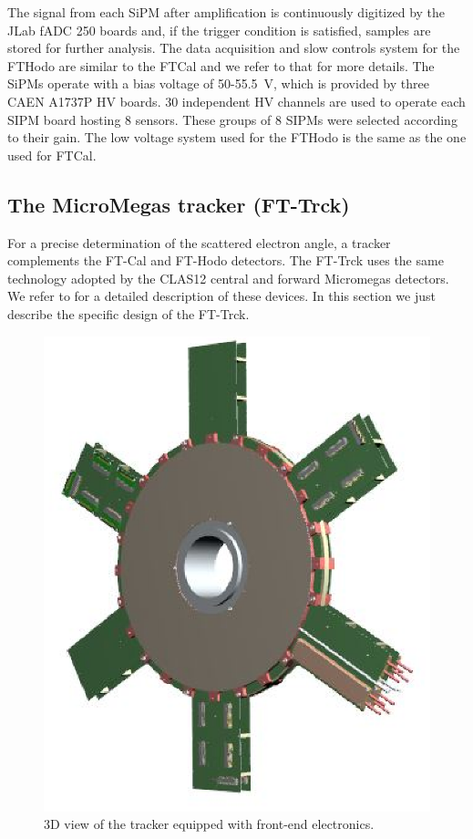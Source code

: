 The signal from each SiPM after amplification is continuously digitized by the JLab fADC 250 boards and, if the trigger condition is satisfied, samples are stored for further analysis. The data acquisition and slow controls system for the FTHodo are similar to the FTCal and we refer to that for more details. The SiPMs operate with a bias voltage of 50-55.5~V, which is provided by three CAEN A1737P HV boards. 30 independent HV channels are used to operate each SIPM board hosting 8 sensors. These groups of 8 SIPMs were selected according to their gain. The low voltage system used for the FTHodo is the same as the one used for FTCal.


\subsection{The MicroMegas tracker (FT-Trck)}
For a precise determination of the scattered electron angle, a tracker complements the FT-Cal and FT-Hodo detectors. The FT-Trck uses the same technology adopted by the CLAS12 central and forward Micromegas detectors. We refer to \cite{mm} for a detailed description of  these devices. In this section we just describe the specific design of the FT-Trck.
\begin{figure}[th!]
\centering 
\includegraphics[width=1.0\columnwidth]{./fig/FTtrck.eps}
\caption{3D view of the tracker equipped with front-end electronics.}
\label{fig:ft-trck} 
\end{figure}

